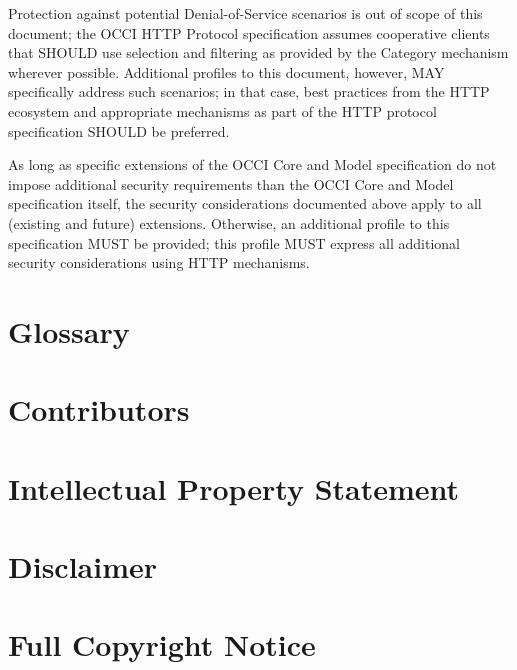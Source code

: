 \documentclass[10pt,a4paper]{article}
\begin{document}
Protection against potential Denial-of-Service scenarios is out of
scope of this document; the OCCI HTTP Protocol specification assumes
cooperative clients that SHOULD use selection and filtering as
provided by the Category mechanism wherever possible. Additional
profiles to this document, however, MAY specifically address such
scenarios; in that case, best practices from the HTTP ecosystem and
appropriate mechanisms as part of the HTTP protocol specification
SHOULD be preferred.

As long as specific extensions of the OCCI Core and Model
specification do not impose additional security requirements than the
OCCI Core and Model specification itself, the security considerations
documented above apply to all (existing and future)
extensions. Otherwise, an additional profile to this specification
MUST be provided; this profile MUST express all additional security
considerations using HTTP mechanisms.

\section{Glossary}
\label{sec:glossary}


\section{Contributors}
\label{sec:contrib}


\section{Intellectual Property Statement}
\label{sec:ips}


\section{Disclaimer}
\label{sec:disclaim}


\section{Full Copyright Notice}
\label{sec:copy}




\end{document}
